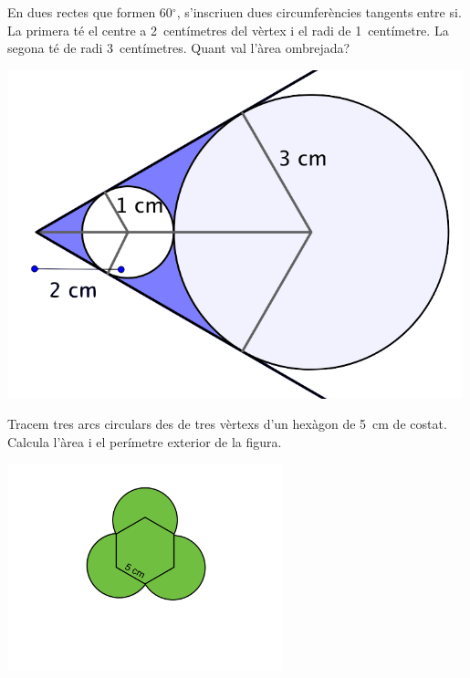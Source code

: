 \begin{mylist}
 
\vspace{-1.5cm}
\exer \hot \begin{minipage}[t]{0.62\textwidth}
	En dues rectes que formen 60${}^\circ$,  s'inscriuen dues circumferències tangents entre si.  La primera té el centre a 2~centímetres del vèrtex i el radi de 1~centímetre. La segona  té de radi 3~centímetres. Quant val l'àrea ombrejada? 
	
\end{minipage}
\begin{minipage}{0.3\textwidth}
	\centering
	\vspace{1.5cm}
	\includegraphics[width=0.99\textwidth]{img-09/fig16}
\end{minipage}
 
 
 \vspace{-1.5cm}
 \exer[1] \begin{minipage}[t]{0.62\textwidth}
	  Tracem tres arcs circulars des de tres vèrtexs d'un hexàgon de 5~cm de costat. 
	  Calcula l'àrea i el perímetre exterior de la figura.
 \end{minipage}
 \begin{minipage}{0.3\textwidth}
 	\centering
 	\vspace{1.5cm}
 	\includegraphics[width=0.6\textwidth]{img-09/fig15}
 \end{minipage}
  
 
\end{mylist}
 
